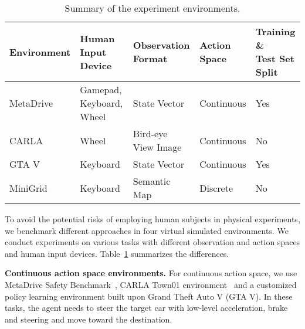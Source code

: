 \begin{table}[H]
\centering
\begin{small}
\caption{Summary of the experiment environments.}
\label{table:environment}
\begin{tabular}{@{}lllll@{}}
\toprule
Environment                & Human Input Device & Observation Format  & Action Space & \shortstack{Training \& \\Test Set Split} \\ \midrule
MetaDrive & Gamepad, Keyboard, Wheel & State Vector        & Continuous   & Yes                         \\
CARLA                      & Wheel              & Bird-eye View Image & Continuous   & No                          \\
GTA V                      & Keyboard           & State Vector & Continuous   & Yes    
     \\
MiniGrid                   & Keyboard           & Semantic Map        & Discrete     & No                          \\
\bottomrule
\end{tabular}
\end{small}
\end{table}


To avoid the potential risks of employing human subjects in physical experiments, we benchmark different approaches in four virtual simulated environments.
We conduct experiments on various tasks with different observation and action spaces and human input devices. 
Table~\ref{table:environment} summarizes the differences.

\textbf{Continuous action space environments.}
For continuous action space, we use MetaDrive Safety Benchmark~\citep{li2021metadrive}, CARLA Town01 environment~\citep{Dosovitskiy17} and a customized policy learning environment built upon Grand Theft Auto V (GTA V). In these tasks, the agent needs to steer the target car with low-level acceleration, brake and steering and move toward the destination.


